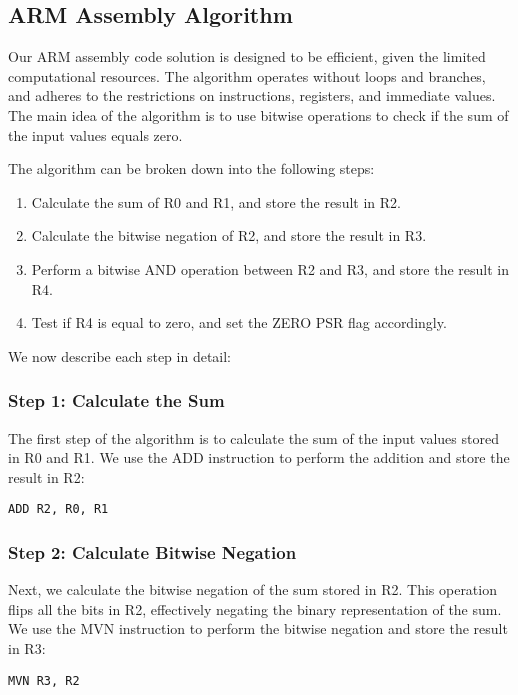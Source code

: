 \begin{thebibliography}{9}
\subsection{ARM Assembly Algorithm}

Our ARM assembly code solution is designed to be efficient, given the limited computational resources. The algorithm operates without loops and branches, and adheres to the restrictions on instructions, registers, and immediate values. The main idea of the algorithm is to use bitwise operations to check if the sum of the input values equals zero.

The algorithm can be broken down into the following steps:

\begin{enumerate}
  \item Calculate the sum of R0 and R1, and store the result in R2.
  \item Calculate the bitwise negation of R2, and store the result in R3.
  \item Perform a bitwise AND operation between R2 and R3, and store the result in R4.
  \item Test if R4 is equal to zero, and set the ZERO PSR flag accordingly.
\end{enumerate}

We now describe each step in detail:

\subsubsection{Step 1: Calculate the Sum}

The first step of the algorithm is to calculate the sum of the input values stored in R0 and R1. We use the ADD instruction to perform the addition and store the result in R2:

\begin{verbatim}
ADD R2, R0, R1
\end{verbatim}

\subsubsection{Step 2: Calculate Bitwise Negation}

Next, we calculate the bitwise negation of the sum stored in R2. This operation flips all the bits in R2, effectively negating the binary representation of the sum. We use the MVN instruction to perform the bitwise negation and store the result in R3:

\begin{verbatim}
MVN R3, R2
\end{verbatim}


\end{thebibliography}
